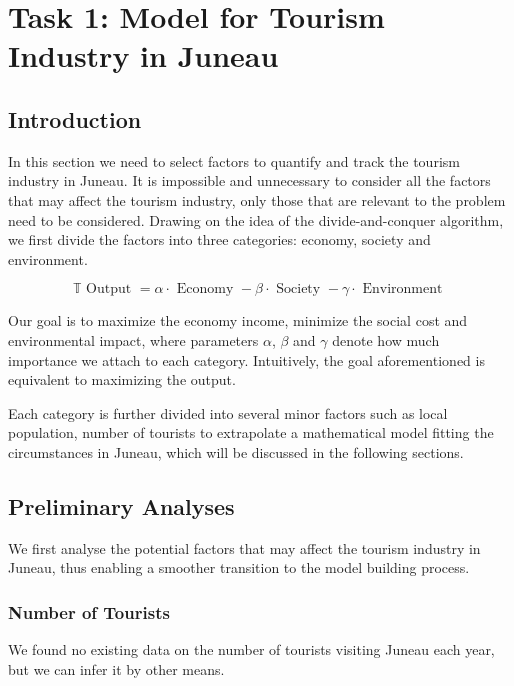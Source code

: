 \section{Task 1: Model for Tourism Industry in Juneau}

\subsection{Introduction}


In this section we need to select factors to quantify and track the tourism industry in Juneau. 
It is impossible and unnecessary to consider all the factors that may affect the 
tourism industry, only those that are relevant to the problem need to be considered.
Drawing on the idea of the divide-and-conquer algorithm, we first divide the factors 
into three categories: economy, society and environment. 


\begin{equation}
    \mathbb{T}\text { Output }=\alpha \cdot \text { Economy }-\beta \cdot \text { Society }-\gamma \cdot \text { Environment }
\end{equation}

Our goal is to maximize the economy income, minimize the social cost and environmental impact,
where parameters $\alpha$, $\beta$ and $\gamma$ denote how much importance we attach to each category.
Intuitively, the goal aforementioned is equivalent to maximizing the output.

Each category is further divided into several minor factors such as local population, 
number of tourists to extrapolate a mathematical model fitting the circumstances in Juneau,
which will be discussed in the following sections.

\subsection{Preliminary Analyses}

We first analyse the potential factors that may affect the tourism industry in Juneau, thus enabling
 a smoother transition to the model building process.

 \subsubsection{Number of Tourists}

 We found no existing data on the number of tourists visiting Juneau each year, but we can infer it
 by other means.

